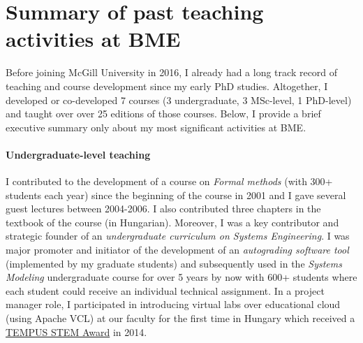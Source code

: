 



\section{Summary of past teaching activities at BME}

Before joining McGill University in 2016, I already had a long track record of teaching and course development since my early PhD studies. Altogether, I developed or co-developed 7 courses (3 undergraduate, 3 MSc-level, 1 PhD-level) and taught  over over 25 editions of those courses. Below, I provide a brief executive summary only about my most significant activities at BME. 

\paragraph{Undergraduate-level teaching}
I contributed to the development of a course on \emph{Formal methods} (with 300+ students each year) since the beginning of the course in 2001 and I gave several guest lectures between 2004-2006. I also contributed three chapters in the textbook of the course (in Hungarian).  Moreover, I was a key contributor and strategic founder of an \emph{undergraduate curriculum on Systems Engineering}.  I was major promoter and initiator of the development of an \emph{autograding software tool} (implemented by my graduate students) and subsequently used in the \emph{Systems Modeling} undergraduate course for over 5 years by now with 600+ students where each student could receive an individual technical assignment. 
In a project manager role, I participated in introducing virtual labs over educational cloud (using Apache VCL) at our faculty for the first time in Hungary which received a \href{https://inf.mit.bme.hu/en/news/2014/02/tempus-stem-call-apache-vcl-based-labs-won-prize}{TEMPUS STEM Award} in 2014. 

